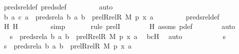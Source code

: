 \begin{isabellebody}
\ preds{\isacharunderscore}{\kern0pt}rel{\isacharunderscore}{\kern0pt}def\ preds{\isacharunderscore}{\kern0pt}def\ \isanewline
\ \ \ \ \ \ \isamarkupfalse%
\ auto\isanewline
\isanewline
\ \ \ \ \isamarkupfalse%
\ {\isachardoublequoteopen}{\isacharless}{\kern0pt}{\isacharless}{\kern0pt}b{\isacharcomma}{\kern0pt}\ a{\isachargreater}{\kern0pt}{\isacharcomma}{\kern0pt}\ {\isacharless}{\kern0pt}c{\isacharcomma}{\kern0pt}\ a{\isachargreater}{\kern0pt}{\isachargreater}{\kern0pt}\ {\isasymin}\ preds{\isacharunderscore}{\kern0pt}rel{\isacharparenleft}{\kern0pt}{\isasymlambda}a\ b{\isachardot}{\kern0pt}\ {\isasymlangle}a{\isacharcomma}{\kern0pt}\ b{\isasymrangle}\ {\isasymin}\ prel{\isacharparenleft}{\kern0pt}Rrel{\isacharparenleft}{\kern0pt}R{\isacharcomma}{\kern0pt}\ M{\isacharparenright}{\kern0pt}{\isacharcomma}{\kern0pt}\ p{\isacharparenright}{\kern0pt}{\isacharcomma}{\kern0pt}\ {\isasymlangle}x{\isacharcomma}{\kern0pt}\ a{\isasymrangle}{\isacharparenright}{\kern0pt}{\isachardoublequoteclose}\ \isanewline
\ \ \ \ \ \ \isamarkupfalse%
\ preds{\isacharunderscore}{\kern0pt}rel{\isacharunderscore}{\kern0pt}def\ \isanewline
\ \ \ \ \ \ \isamarkupfalse%
\ H{}\ H{}\ \isanewline
\ \ \ \ \ \ \isamarkupfalse%
\ simp\isanewline
\ \ \ \ \ \ \isamarkupfalse%
{\isacharparenleft}{\kern0pt}rule\ prelI{\isacharparenright}{\kern0pt}\isanewline
\ \ \ \ \ \ \isamarkupfalse%
\ H{}\ assms\ p{\isacharunderscore}{\kern0pt}def\isanewline
\ \ \ \ \ \ \isamarkupfalse%
\ auto\isanewline
\isanewline
\ \ \ \ \isamarkupfalse%
\ \isamarkupfalse%
\ {\isachardoublequoteopen}s\ {\isasymin}\ preds{\isacharunderscore}{\kern0pt}rel{\isacharparenleft}{\kern0pt}{\isasymlambda}a\ b{\isachardot}{\kern0pt}\ {\isasymlangle}a{\isacharcomma}{\kern0pt}\ b{\isasymrangle}\ {\isasymin}\ prel{\isacharparenleft}{\kern0pt}Rrel{\isacharparenleft}{\kern0pt}R{\isacharcomma}{\kern0pt}\ M{\isacharparenright}{\kern0pt}{\isacharcomma}{\kern0pt}\ p{\isacharparenright}{\kern0pt}{\isacharcomma}{\kern0pt}\ {\isasymlangle}x{\isacharcomma}{\kern0pt}\ a{\isasymrangle}{\isacharparenright}{\kern0pt}{\isachardoublequoteclose}\ \isamarkupfalse%
\ bcH\ \isamarkupfalse%
\ auto\ \isanewline
\ \ \isamarkupfalse%
\ \isanewline
\ \ \ \ \isamarkupfalse%
\ s\ \isamarkupfalse%
\ {\isachardoublequoteopen}s\ {\isasymin}\ preds{\isacharunderscore}{\kern0pt}rel{\isacharparenleft}{\kern0pt}{\isasymlambda}a\ b{\isachardot}{\kern0pt}\ {\isasymlangle}a{\isacharcomma}{\kern0pt}\ b{\isasymrangle}\ {\isasymin}\ prel{\isacharparenleft}{\kern0pt}Rrel{\isacharparenleft}{\kern0pt}R{\isacharcomma}{\kern0pt}\ M{\isacharparenright}{\kern0pt}{\isacharcomma}{\kern0pt}\ p{\isacharparenright}{\kern0pt}{\isacharcomma}{\kern0pt}\ {\isasymlangle}x{\isacharcomma}{\kern0pt}\ a{\isasymrangle}{\isacharparenright}{\kern0pt}{\isachardoublequoteclose}\ \isanewline

\end{isabellebody}
